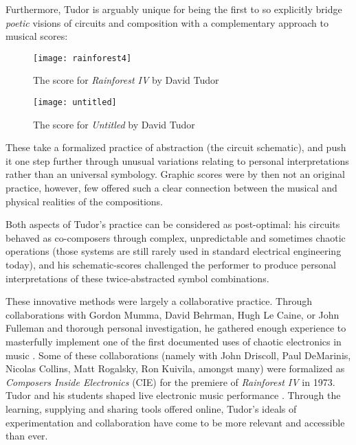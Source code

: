 \citep{tudor1976,nakai2014}

Furthermore, Tudor is arguably unique for being the first to so explicitly bridge \textit{poetic} visions of circuits and composition with a complementary approach to musical scores:   

\begin{figure}[H]
	  \centering
	    \texttt{[image: rainforest4]}
	    \caption{The score for \emph{Rainforest IV} by David Tudor}
	\end{figure}

	\begin{figure}[H]
	  \centering
	    \texttt{[image: untitled]}
	      \caption{The score for \emph{Untitled} by David Tudor}
	\end{figure}
	
These take a formalized practice of abstraction (the circuit schematic), and push it one step further through unusual variations relating to personal interpretations rather than an universal symbology. Graphic scores were by then not an original practice, however, few offered such a clear connection between the musical and physical realities of the compositions.

Both aspects of Tudor's practice can be considered as post-optimal: his circuits behaved as co-composers through complex, unpredictable and sometimes chaotic operations (those systems are still rarely used in standard electrical engineering today), and his schematic-scores challenged the performer to produce personal interpretations of these twice-abstracted symbol combinations. 

These innovative methods were largely a collaborative practice. Through collaborations with Gordon Mumma, David Behrman, Hugh Le Caine, or John Fulleman and thorough personal investigation, he gathered enough experience to masterfully implement one of the first documented uses of chaotic electronics in music \citep{kuivila2004}. Some of these collaborations (namely with John Driscoll, Paul DeMarinis, Nicolas Collins, Matt Rogalsky, Ron Kuivila, amongst many) were formalized as \textit{Composers Inside Electronics} (CIE) for the premiere of \textit{Rainforest IV} in 1973. Tudor and his students shaped live electronic music performance \citep{collins2004,collins2006,collins2008,collins2010,nakai2014,driscoll2004,kuivila2004}. Through the learning, supplying and sharing tools offered online, Tudor’s ideals of experimentation and collaboration have come to be more relevant and accessible than ever.   


